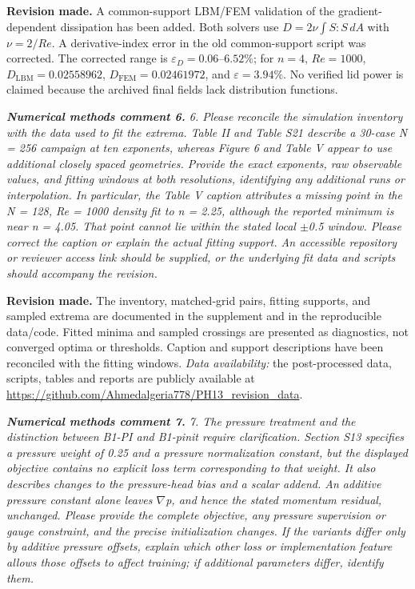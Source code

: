 \documentclass[11pt,a4paper]{article}
\newcommand{\qcomment}[1]{\textcolor{deepblue}{\itshape #1}}
\newcommand{\revwork}[1]{\textbf{\textcolor{revgreen}{#1}}}
\begin{document}
\noindent\revwork{Revision made.} A common-support LBM/FEM validation of the gradient-dependent dissipation has been added. Both solvers use $D=2\nu\int S:S\,dA$ with $\nu=2/Re$. A derivative-index error in the old common-support script was corrected. The corrected range is $\varepsilon_D=0.06$--$6.52\%$; for $n=4$, $Re=1000$, $D_{\mathrm{LBM}}=0.02558962$, $D_{\mathrm{FEM}}=0.02461972$, and $\varepsilon=3.94\%$. No verified lid power is claimed because the archived final fields lack distribution functions.

\medskip
\noindent\qcomment{\textbf{Numerical methods comment 6.} 6. Please reconcile the simulation inventory with the data used to fit the extrema. Table II and Table S21 describe a 30-case N = 256 campaign at ten exponents, whereas Figure 6 and Table V appear to use additional closely spaced geometries. Provide the exact exponents, raw observable values, and fitting windows at both resolutions, identifying any additional runs or interpolation. In particular, the Table V caption attributes a missing point in the N = 128, Re = 1000 density fit to n = 2.25, although the reported minimum is near n = 4.05. That point cannot lie within the stated local $\pm$0.5 window. Please correct the caption or explain the actual fitting support. An accessible repository or reviewer access link should be supplied, or the underlying fit data and scripts should accompany the revision.}

\noindent\revwork{Revision made.} The inventory, matched-grid pairs, fitting supports, and sampled extrema are documented in the supplement and in the reproducible data/code. Fitted minima and sampled crossings are presented as diagnostics, not converged optima or thresholds. Caption and support descriptions have been reconciled with the fitting windows. \emph{Data availability:} the post-processed data, scripts, tables and reports are publicly available at \url{https://github.com/Ahmedalgeria778/PH13_revision_data}.

\medskip
\noindent\qcomment{\textbf{Numerical methods comment 7.} 7. The pressure treatment and the distinction between B1-PI and B1-pinit require clarification. Section S13 specifies a pressure weight of 0.25 and a pressure normalization constant, but the displayed objective contains no explicit loss term corresponding to that weight. It also describes changes to the pressure-head bias and a scalar addend. An additive pressure constant alone leaves $\nabla$p, and hence the stated momentum residual, unchanged. Please provide the complete objective, any pressure supervision or gauge constraint, and the precise initialization changes. If the variants differ only by additive pressure offsets, explain which other loss or implementation feature allows those offsets to affect training; if additional parameters differ, identify them.}
\end{document}
